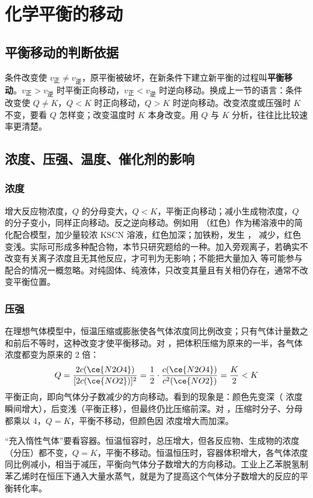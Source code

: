 \documentclass[UTF8,a4paper,zihao=5,oneside,openany,fontset=none]{ctexbook}
\newcommand{\vz}{v_{\text{正}}}
\newcommand{\vn}{v_{\text{逆}}}
\begin{document}
\section{化学平衡的移动}

\subsection{平衡移动的判断依据}
条件改变使 $\vz\neq\vn$，原平衡被破坏，在新条件下建立新平衡的过程叫\textbf{平衡移动}。$\vz>\vn$ 时平衡正向移动，$\vz<\vn$ 时逆向移动。换成上一节的语言：条件改变使 $Q\neq K$，$Q<K$ 时正向移动，$Q>K$ 时逆向移动。改变浓度或压强时 $K$ 不变，要看 $Q$ 怎样变；改变温度时 $K$ 本身改变。用 $Q$ 与 $K$ 分析，往往比比较速率更清楚。

\subsection{浓度、压强、温度、催化剂的影响}
\subsubsection{浓度}
增大反应物浓度，$Q$ 的分母变大，$Q<K$，平衡正向移动；减小生成物浓度，$Q$ 的分子变小，同样正向移动。反之逆向移动。例如用 （红色）作为稀溶液中的简化配合模型，加少量较浓 KSCN 溶液，红色加深；加铁粉，发生 ， 减少，红色变浅。实际可形成多种配合物，本节只研究题给的一种。加入旁观离子，若确实不改变有关离子浓度且无其他反应，才可判为无影响；不能把大量加入  等可能参与配合的情况一概忽略。对纯固体、纯液体，只改变其量且有关相仍存在，通常不改变平衡位置。

\subsubsection{压强}
在理想气体模型中，恒温压缩或膨胀使各气体浓度同比例改变；只有气体计量数之和前后不等时，这种改变才使平衡移动。对 ，把体积压缩为原来的一半，各气体浓度都变为原来的 2 倍：
\[Q=\frac{2c(\ce{N2O4})}{[2c(\ce{NO2})]^2}=\frac{1}{2}\cdot\frac{c(\ce{N2O4})}{c^2(\ce{NO2})}=\frac{K}{2}<K\]
平衡正向，即向气体分子数减少的方向移动。看到的现象是：颜色先变深（ 浓度瞬间增大），后变浅（平衡正移），但最终仍比压缩前深。对 ，压缩时分子、分母都乘以 4，$Q=K$，平衡不移动，但颜色因  浓度增大而加深。

“充入惰性气体”要看容器。恒温恒容时，总压增大，但各反应物、生成物的浓度（分压）都不变，$Q=K$，平衡不移动。恒温恒压时，容器体积增大，各气体浓度同比例减小，相当于减压，平衡向气体分子数增大的方向移动。工业上乙苯脱氢制苯乙烯时在恒压下通入大量水蒸气，就是为了提高这个气体分子数增大的反应的平衡转化率。
\end{document}
